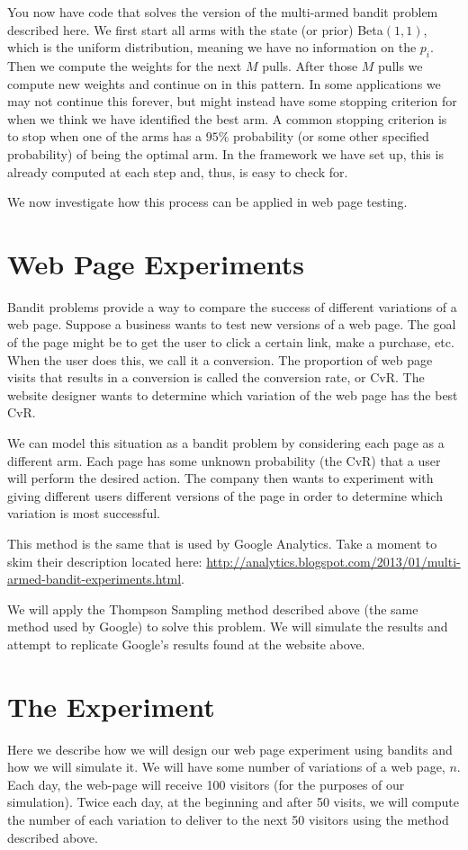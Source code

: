 You now have code that solves the version of the multi-armed bandit problem described here.
We first start all arms with the state (or prior) Beta$(1,1)$,
which is the uniform distribution, meaning we have no information on the $p_i$.
Then we compute the weights for the next $M$ pulls.
After those $M$ pulls we compute new weights and continue on in this pattern.
In some applications we may not continue this forever, but might instead have some stopping
criterion for when we think we have identified the best arm.
A common stopping criterion is to stop when one of the arms has a $95\%$ probability
(or some other specified probability) of being the optimal arm.
In the framework we have set up, this is already computed at each step and, thus, is easy to check for.

We now investigate how this process can be applied
in web page testing.

\section*{Web Page Experiments}
Bandit problems provide a way to compare the success of different variations of a web page.
Suppose a business wants to test new versions of a web page.
The goal of the page might be to get the user to click a certain link, make a purchase, etc.
When the user does this, we call it a conversion.  The proportion of web page visits
that results in a conversion is called the conversion rate, or CvR.
The website designer wants to determine which variation of the web page has the best CvR.

We can model this situation as a bandit problem by considering each page as a different arm.
Each page has some unknown probability (the CvR) that a user will perform the desired action.
The company then wants to experiment with giving different users different versions of
the page in order to determine which variation is most successful.

This method is the same that is used by Google Analytics.  Take a moment to skim their description 
located here:
\url{http://analytics.blogspot.com/2013/01/multi-armed-bandit-experiments.html}.

We will apply the Thompson Sampling method described above (the same method 
used by Google)
to solve this problem.  We will simulate the results and attempt to replicate Google's results 
found at the website above.

\section*{The Experiment}
Here we describe how we will design our web page experiment using bandits and how we will 
simulate it.
We will have some number of variations of a web page, $n$.  Each day, the web-page will receive 
100 visitors
(for the purposes of our simulation).  Twice each day, at the beginning and after 50 visits,
we will compute the number of each variation to deliver to the next 50 visitors using the 
method described above.


